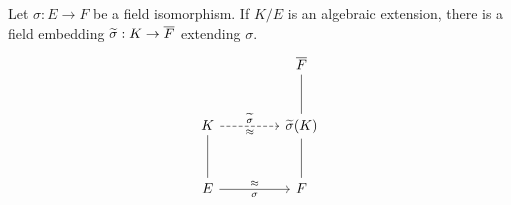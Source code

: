 \begin{thm}\label{iet 3}
    Let $\sigma: E\rightarrow F$ be a field isomorphism.
    If $K/E$ is an algebraic extension, there is a field embedding $\widetilde{\sigma}: K\rightarrow\overline{F}$ extending $\sigma$.
    \begin{equation*}
        \begin{tikzcd}[row sep=1.0cm, column sep=1.5cm]
            &   \ol F\\
            K\arrow[r, "\widetilde{\sigma}", "\approx"', dashed]
            &
            \widetilde{\sigma}(K)\arrow[u, dash]\\
            E\arrow[u, dash]\arrow[r, "\approx", "\sigma"']
            &
            F\arrow[u, dash]
        \end{tikzcd}
    \end{equation*}
\end{thm}
